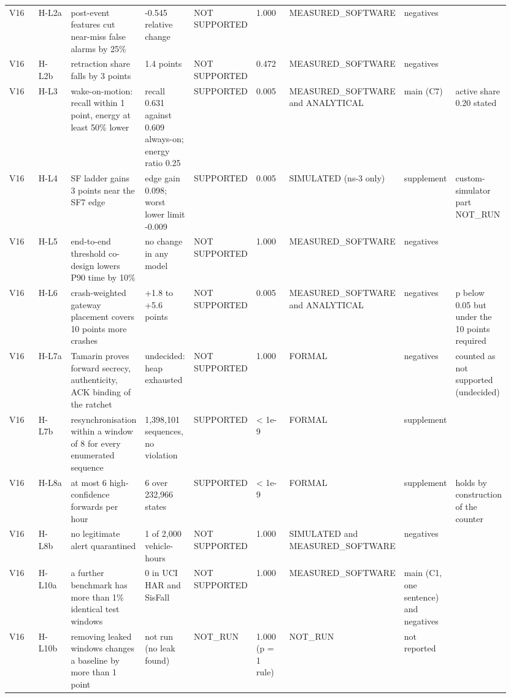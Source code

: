 {\begin{longtable}{p{0.106\linewidth}p{0.106\linewidth}p{0.106\linewidth}p{0.106\linewidth}p{0.106\linewidth}p{0.106\linewidth}p{0.106\linewidth}p{0.106\linewidth}p{0.106\linewidth}}
V16 & H-L2a & post-event features cut near-miss false alarms by 25\% & -0.545 relative change & NOT SUPPORTED & 1.000 & MEASURED\_SOFTWARE & negatives &  \\
V16 & H-L2b & retraction share falls by 3 points & 1.4 points & NOT SUPPORTED & 0.472 & MEASURED\_SOFTWARE & negatives &  \\
V16 & H-L3 & wake-on-motion: recall within 1 point, energy at least 50\% lower & recall 0.631 against 0.609 always-on; energy ratio 0.25 & SUPPORTED & 0.005 & MEASURED\_SOFTWARE and ANALYTICAL & main (C7) & active share 0.20 stated \\
V16 & H-L4 & SF ladder gains 3 points near the SF7 edge & edge gain 0.098; worst lower limit -0.009 & SUPPORTED & 0.005 & SIMULATED (ns-3 only) & supplement & custom-simulator part NOT\_RUN \\
V16 & H-L5 & end-to-end threshold co-design lowers P90 time by 10\% & no change in any model & NOT SUPPORTED & 1.000 & MEASURED\_SOFTWARE & negatives &  \\
V16 & H-L6 & crash-weighted gateway placement covers 10 points more crashes & +1.8 to +5.6 points & NOT SUPPORTED & 0.005 & MEASURED\_SOFTWARE and ANALYTICAL & negatives & p below 0.05 but under the 10 points required \\
V16 & H-L7a & Tamarin proves forward secrecy, authenticity, ACK binding of the ratchet & undecided: heap exhausted & NOT SUPPORTED & 1.000 & FORMAL & negatives & counted as not supported (undecided) \\
V16 & H-L7b & resynchronisation within a window of 8 for every enumerated sequence & 1,398,101 sequences, no violation & SUPPORTED & < 1e-9 & FORMAL & supplement &  \\
V16 & H-L8a & at most 6 high-confidence forwards per hour & 6 over 232,966 states & SUPPORTED & < 1e-9 & FORMAL & supplement & holds by construction of the counter \\
V16 & H-L8b & no legitimate alert quarantined & 1 of 2,000 vehicle-hours & NOT SUPPORTED & 1.000 & SIMULATED and MEASURED\_SOFTWARE & negatives &  \\
V16 & H-L10a & a further benchmark has more than 1\% identical test windows & 0 in UCI HAR and SisFall & NOT SUPPORTED & 1.000 & MEASURED\_SOFTWARE & main (C1, one sentence) and negatives &  \\
V16 & H-L10b & removing leaked windows changes a baseline by more than 1 point & not run (no leak found) & NOT\_RUN & 1.000 (p = 1 rule) & NOT\_RUN & not reported &  \\

\end{longtable}}
